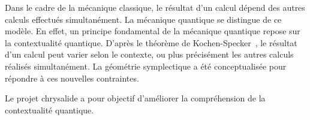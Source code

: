 \documentclass[10pt, a4paper, french]{article}
\begin{document}

Dans le cadre de la mécanique classique, le résultat d'un calcul dépend des autres calculs effectués simultanément.
La mécanique quantique se distingue de ce modèle. En effet, un principe fondamental de la mécanique quantique repose sur la contextualité quantique. D'après le théorème de Kochen-Specker~\cite{RevModPhys.94.045007}, le résultat d'un calcul peut varier selon le contexte, ou plus précisément les autres calculs réalisés simultanément. La géométrie symplectique a été conceptualisée pour répondre à ces nouvelles contraintes. 

Le projet chrysalide a pour objectif d'améliorer la compréhension de la contextualité quantique.
\end{document}
